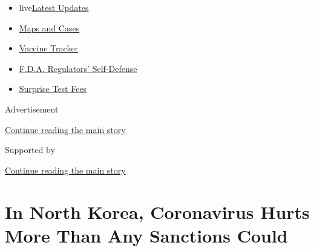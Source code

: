 \begin{itemize}
\tightlist
\item
  live\href{https://www.nytimes3xbfgragh.onion/2020/09/11/world/covid-19-coronavirus.html?name=styln-coronavirus-national\&region=TOP_BANNER\&block=storyline_menu_recirc\&action=click\&pgtype=Article\&impression_id=219261f0-f4b9-11ea-a90a-b333a65d9ace\&variant=undefined}{Latest
  Updates}
\item
  \href{https://www.nytimes3xbfgragh.onion/interactive/2020/us/coronavirus-us-cases.html?name=styln-coronavirus-national\&region=TOP_BANNER\&block=storyline_menu_recirc\&action=click\&pgtype=Article\&impression_id=219261f1-f4b9-11ea-a90a-b333a65d9ace\&variant=undefined}{Maps
  and Cases}
\item
  \href{https://www.nytimes3xbfgragh.onion/interactive/2020/science/coronavirus-vaccine-tracker.html?name=styln-coronavirus-national\&region=TOP_BANNER\&block=storyline_menu_recirc\&action=click\&pgtype=Article\&impression_id=219261f2-f4b9-11ea-a90a-b333a65d9ace\&variant=undefined}{Vaccine
  Tracker}
\item
  \href{https://www.nytimes3xbfgragh.onion/2020/09/10/us/politics/fda-coronavirus-vaccine.html?name=styln-coronavirus-national\&region=TOP_BANNER\&block=storyline_menu_recirc\&action=click\&pgtype=Article\&impression_id=219261f3-f4b9-11ea-a90a-b333a65d9ace\&variant=undefined}{F.D.A.
  Regulators' Self-Defense}
\item
  \href{https://www.nytimes3xbfgragh.onion/2020/09/09/upshot/coronavirus-surprise-test-fees.html?name=styln-coronavirus-national\&region=TOP_BANNER\&block=storyline_menu_recirc\&action=click\&pgtype=Article\&impression_id=219261f4-f4b9-11ea-a90a-b333a65d9ace\&variant=undefined}{Surprise
  Test Fees}
\end{itemize}

Advertisement

\protect\hyperlink{after-top}{Continue reading the main story}

Supported by

\protect\hyperlink{after-sponsor}{Continue reading the main story}

\hypertarget{in-north-korea-coronavirus-hurts-more-than-any-sanctions-could}{%
\section{In North Korea, Coronavirus Hurts More Than Any Sanctions
Could}\label{in-north-korea-coronavirus-hurts-more-than-any-sanctions-could}}

